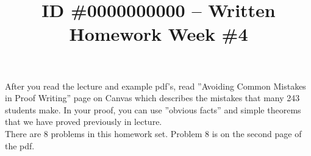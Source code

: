 \documentclass{article}
\title{ID \#0000000000 – Written Homework Week \#4}
\begin{document}

\maketitle

    After you read the lecture and example pdf’s, read ”Avoiding Common Mistakes in Proof Writing” page on Canvas which describes the mistakes that many 243 students make. In your proof, you can use ”obvious facts” and simple theorems that we have proved previously in lecture.\\
    
    There are 8 problems in this homework set. Problem 8 is on the second page of the pdf.
\end{document}
